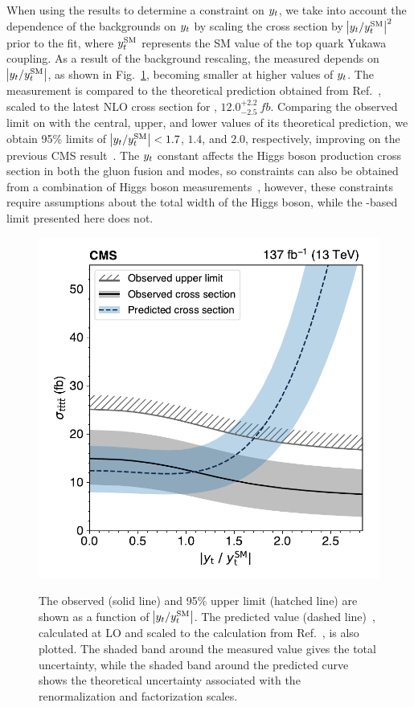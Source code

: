 When using the \tttt results to determine a constraint on $y_{t}$, we take
into account the dependence of the backgrounds on $y_{t}$ by scaling the
\ttH cross section by $\abs{y_{t}/y_{t}^{\mathrm{SM}}}^2$ prior to the
fit, where $y_{t}^{\mathrm{SM}}$ represents the SM value of the top quark
Yukawa coupling. As a result of the \ttH background rescaling, the measured
\xsectttt depends on $\abs{y_{t}/y_{t}^{\mathrm{SM}}}$, as shown in
Fig.~\ref{fig:yukawa}, becoming smaller at higher values of $y_{t}$. The
measurement is compared to the theoretical prediction obtained from
Ref.~\cite{THEORY:TopYukawaTTTT}, scaled to the latest NLO cross section for
\tttt, $12.0^{+2.2}_{-2.5}~\unit{fb}$. Comparing the observed limit on
\xsectttt with the central, upper, and lower values of its theoretical
prediction, we obtain 95\% \CL limits of
$\abs{y_{t}/y_{t}^{\mathrm{SM}}} < 1.7$, $1.4$, and $2.0$,
respectively, improving on the previous CMS \tttt
result~\cite{CMS:myTOP2016}. The $y_{t}$ constant affects the Higgs boson
production cross section in both the gluon fusion and \ttH modes, so
constraints can also be obtained from a combination of Higgs boson
measurements~\cite{STAT:AtlasCmsHiggsComb}, however, these constraints
require assumptions about the total width of the Higgs boson, while the
\tttt-based limit presented here does not.

\begin{figure}[!hbtp]
\centering
\includegraphics[width=.70\textwidth]{figs/ftp/yukawa.pdf}
\\
\caption{
    The observed \xsectttt (solid line) and 95\% \CL upper limit (hatched line) are shown as a function
    of $\abs{y_{t}/y_{t}^{\mathrm{SM}}}$. The predicted value (dashed line)~\cite{THEORY:TopYukawaTTTT},
    calculated at LO and scaled to the calculation from Ref.~\cite{THEORY:Frederix2017wme}, is also plotted.
    The shaded band around the measured value gives the total uncertainty, while the shaded band around
    the predicted curve shows the theoretical uncertainty associated with the renormalization and
    factorization scales.
}
\label{fig:yukawa}
\end{figure}


